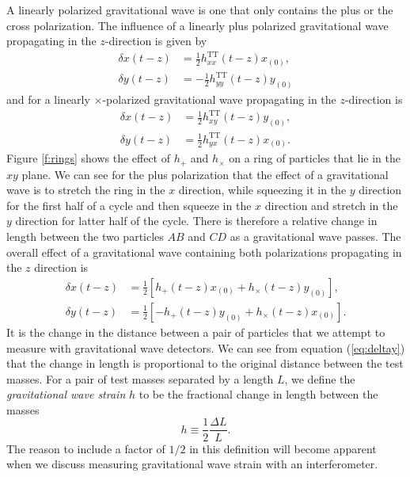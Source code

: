 A linearly polarized gravitational wave is one that only contains the plus or
the cross polarization. The influence of a linearly plus polarized
gravitational wave propagating in the $z$-direction is given by
\begin{align}
\delta x(t-z) &= \frac{1}{2} h_{xx}^\mathrm{TT}(t-z) x_{(0)},\\
\delta y(t-z) &= -\frac{1}{2} h_{yy}^\mathrm{TT}(t-z) y_{(0)}
\end{align}
and for a linearly $\times$-polarized gravitational wave
propagating in the $z$-direction is
\begin{align}
\delta x(t-z) &= \frac{1}{2} h_{xy}^\mathrm{TT}(t-z) y_{(0)},\\
\delta y(t-z) &= \frac{1}{2} h_{yx}^\mathrm{TT}(t-z) x_{(0)}.
\end{align}
Figure \ref{f:rings} shows the effect of $h_{+}$ and $h_{\times}$ on a ring
of particles that lie in the $xy$ plane. We can see for the plus polarization
that the effect of a gravitational wave is to stretch the ring
in the $x$ direction, while squeezing it in the $y$ direction for the first
half of a cycle and then squeeze in the $x$ direction and stretch in the $y$
direction for latter half of the cycle.  There is therefore a relative change
in length between the two particles $AB$ and $CD$ as a gravitational wave
passes.  The overall effect of a gravitational wave containing both polarizations
propagating in the $z$ direction is
\begin{align}
\label{eq:deltax}
\delta x(t-z) &= \frac{1}{2}\left[h_{+}(t-z) x_{(0)} + h_{\times}(t-z) y_{(0)}\right],\\
\delta y(t-z) &= \frac{1}{2}\left[-h_{+}(t-z) y_{(0)} + h_{\times}(t-z) x_{(0)}\right].
\label{eq:deltay}
\end{align}
It is the change in the distance between a pair of particles that we attempt
to measure with gravitational wave detectors. We can see from equation
(\ref{eq:deltay}) that the change in length is proportional to the original
distance between the test masses. For a pair of test masses separated by a
length $L$, we define the \emph{gravitational wave strain} $h$ to be the
fractional change in length between the masses
\begin{equation}
h \equiv \frac{1}{2} \frac{\Delta L}{L}.
\end{equation}
The reason to include a factor of $1/2$ in this definition will become
apparent when we discuss measuring gravitational wave strain with an
interferometer.  


